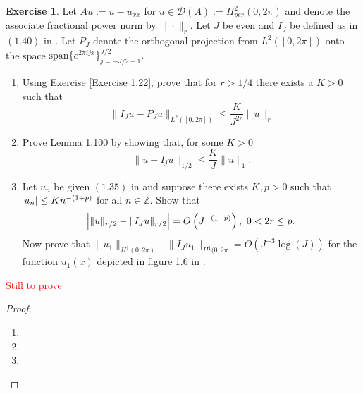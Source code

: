 \documentclass{amsart}
\theoremstyle{plain}
\theoremstyle{definition}
\newtheorem{exer}{Exercise}[section]
\newcommand{\Z}{\mathbb{Z}}
\newcommand{\tcr}[1]{\textcolor{red}{#1}}
\begin{document}
\begin{exer}
    Let $Au := u-u_{xx}$ for $u\in \mathcal{D}(A):=H^2_{per}(0,2\pi)$ and denote the associate fractional power norm by $\|\cdot\|_{r}.$ Let $J$ be even and $I_J$ be defined as in $(1.40)$ in \cite{lord2014introduction}.  Let $P_{J}$ denote the orthogonal projection from $L^2([0,2\pi])$ onto the space $\text{span}\{e^{2\pi i j x}\}_{j=-J/2+1}^{J/2}.$
    \begin{enumerate}[label=\alph*.]
        \item Using Exercise \ref{Exercise 1.22}, prove that for $r>1/4$ there exists a $K>0$ such that
        $$\|I_{J}u - P_{J}u\|_{L^2([0,2\pi])} \leq \frac{K}{J^{2r}}\|u\|_{r}$$
        \item Prove Lemma 1.100 by showing that, for some $K > 0$
        $$\|u-I_{j}u\|_{1/2} \leq \frac{K}{J} \|u\|_{1}.$$
        \item Let $u_n$ be given $(1.35)$ in \cite{lord2014introduction} and suppose there exists $K,p > 0$ such that $\abs{u_n} \leq Kn^{-(1+p)}$ for all $n\in\Z.$ Show that 
        $$\abs{\|u\|_{r/2}-\|I_{J}u\|_{r/2}} = O\left(J^{-(1+p)}\right), \ 0 < 2r \leq p.$$
        Now prove that $\|u_1\|_{H^1(0,2\pi)}-\|I_J u_1\|_{H^1(0,2\pi} = O\left(J^{-3}\log(J)\right)$ for the function $u_1(x)$ depicted in figure 1.6 in \cite{lord2014introduction}. 
    \end{enumerate}
\end{exer}
\tcr{Still to prove}
\begin{proof}
     \begin{enumerate}[label=\alph*.]
        \item 
        \item 
        \item
    \end{enumerate}
\end{proof}
\end{document}
